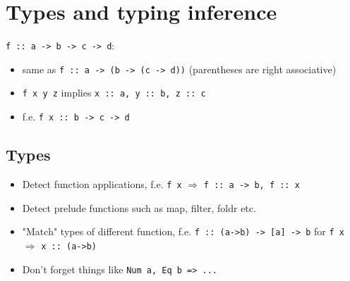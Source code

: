 \documentclass[12pt]{article}
\begin{document}
\section{Types and typing inference}
\texttt{f :: a -> b -> c -> d}:
\begin{itemize}
    \item same as \texttt{f :: a -> (b -> (c -> d))} (parentheses are right associative) 
    \item \texttt{f x y z} implies \texttt{x :: a, y :: b, z :: c} 
    \item f.e. \texttt{f x :: b -> c -> d}
\end{itemize}
\subsection{Types}
\begin{itemize}
    \item Detect function applications, f.e. \texttt{f x} $\Rightarrow$ \texttt{f :: a ->  b, f :: x}
    \item Detect prelude functions such as map, filter, foldr etc.
    \item "Match" types of different function, f.e. \texttt{f :: (a->b) -> [a] -> b} for  \texttt{f x} $\Rightarrow$ \texttt{x :: (a->b)}
    \item Don't forget things like \texttt{Num a, Eq b => ...}
\end{itemize}
\end{document}
